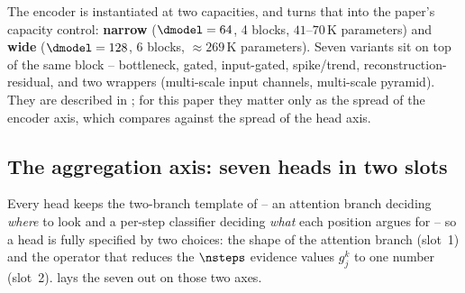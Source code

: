 The encoder is instantiated at two capacities, and  turns that into the paper's
capacity control: \textbf{narrow} ($\dmodel = 64$, 4 blocks, $41$--$70$\,K parameters) and
\textbf{wide} ($\dmodel = 128$, 6 blocks, $\approx 269$\,K parameters). Seven variants sit on top of
the same block -- bottleneck, gated, input-gated, spike/trend, reconstruction-residual, and two
wrappers (multi-scale input channels, multi-scale pyramid). They are described in
; for this paper they matter only as the spread of the encoder axis, which
 compares against the spread of the head axis.

\subsection{The aggregation axis: seven heads in two slots}
\label{sec:design:heads}

Every head keeps the two-branch template of  -- an attention branch deciding
\emph{where} to look and a per-step classifier deciding \emph{what} each position argues for -- so a
head is fully specified by two choices: the shape of the attention branch (slot~1) and the operator
that reduces the $\nsteps$ evidence values $g_j^k$ to one number (slot~2).  lays the
seven out on those two axes.

